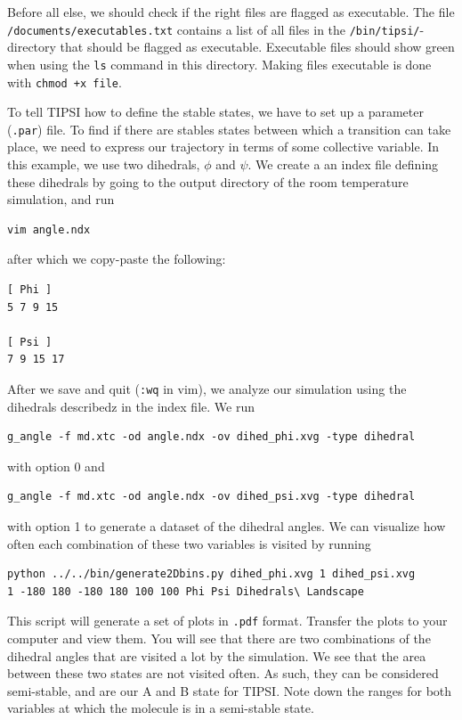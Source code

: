 \documentclass[]{article}
\begin{document}
Before all else, we should check if the right files are flagged as executable. The file \texttt{/documents/executables.txt} contains a list of all files in the \texttt{/bin/tipsi/}-directory that should be flagged as executable. Executable files should show green when using the \texttt{ls} command in this directory. Making files executable is done with \texttt{chmod +x file}.

To tell \textsc{TIPSI} how to define the stable states, we have to set up a parameter (\texttt{.par}) file. To find if there are stables states between which a transition can take place, we need to express our trajectory in terms of some collective variable. In this example, we use two dihedrals, $\phi$ and $\psi$. We create a an index file defining these dihedrals by going to the output directory of the room temperature simulation, and run
%
\begin{lstlisting}
vim angle.ndx
\end{lstlisting}
%
after which we copy-paste the following:
%
\begin{lstlisting}
[ Phi ]
5 7 9 15

[ Psi ]
7 9 15 17
\end{lstlisting}
%
After we save and quit (\texttt{:wq} in vim), we analyze our simulation using the dihedrals describedz in the index file. We run
%
\begin{lstlisting}
g_angle -f md.xtc -od angle.ndx -ov dihed_phi.xvg -type dihedral
\end{lstlisting}
%
with option 0 and 
%
\begin{lstlisting}
g_angle -f md.xtc -od angle.ndx -ov dihed_psi.xvg -type dihedral
\end{lstlisting}
%
with option 1 to generate a dataset of the dihedral angles. We can visualize how often each combination of these two variables is visited by running
%
\begin{lstlisting}
python ../../bin/generate2Dbins.py dihed_phi.xvg 1 dihed_psi.xvg 
1 -180 180 -180 180 100 100 Phi Psi Dihedrals\ Landscape
\end{lstlisting}
%
This script will generate a set of plots in \texttt{.pdf} format. Transfer the plots to your computer and view them. You will see that there are two combinations of the dihedral angles that are visited a lot by the simulation. We see that the area between these two states are not visited often. As such, they can be considered semi-stable, and are our A and B state for \textsc{TIPSI}. Note down the ranges for both variables at which the molecule is in a semi-stable state.
\end{document}
